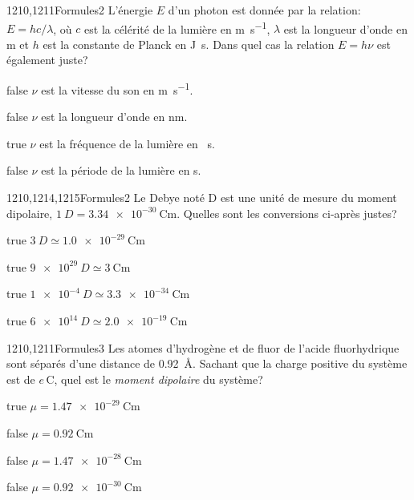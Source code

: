 \documentclass[11pt]{article}
\begin{document}
		\begin{question}{1210,1211}{Formules}{2}{}
            L'énergie $E$ d'un photon est donnée par la relation: $E=hc/\lambda$, où $c$ est la célérité de la lumière en \si{\meter\per\second}, $\lambda$ est la longueur d'onde en \si{\meter} et $h$ est la constante de Planck en \si{\joule\second}. Dans quel cas la relation $E=h\nu$ est également juste?
        \end{question}
        \begin{reponses}
            \item[false] $\nu$ est la vitesse du son en \si{\meter\per\second}.
            \item[false] $\nu$ est la longueur d'onde en \si{\nano\meter}.
            \item[true] $\nu$ est la fréquence de la lumière en \si{\per\second}.
            \item[false] $\nu$ est la période de la lumière en \si{\second}.
        \end{reponses}
		
		\begin{question}{1210,1214,1215}{Formules}{2}{}
			Le Debye noté \si{D} est une unité de mesure du moment dipolaire, $\SI{1}{D} = \SI{3.34e-30}{\coulomb\meter}$. Quelles sont les conversions ci-après justes?
        \end{question}
        \begin{reponses}
    	    \item[true] $\SI{3}{D} \simeq  \SI{1.0e-29}{\coulomb\meter}$
    	    \item[true] $\SI{9e29}{D} \simeq  \SI{3}{\coulomb\meter}$
    	    \item[true] $\SI{1e-4}{D} \simeq  \SI{3.3e-34}{\coulomb\meter}$
    	    \item[true] $\SI{6e14}{D} \simeq  \SI{2.0e-19}{\coulomb\meter}$
        \end{reponses}
		
		\begin{question}{1210,1211}{Formules}{3}{}
			Les atomes d'hydrogène et de fluor de l'acide fluorhydrique sont séparés d'une distance de \SI{0.92}{\angstrom}. Sachant que la charge positive du système est de $e\,\si{\coulomb}$, quel est le \emph{moment dipolaire} du système?
        \end{question}
        \begin{reponses}
    	    \item[true] $\mu = \SI{1.47e-29}{\coulomb\meter}$
    	    \item[false] $\mu = \SI{0.92}{\coulomb\meter}$
    	    \item[false] $\mu = \SI{1.47e-28}{\coulomb\meter}$
    	    \item[false] $\mu = \SI{0.92e-30}{\coulomb\meter}$
        \end{reponses}
        
\end{document}
